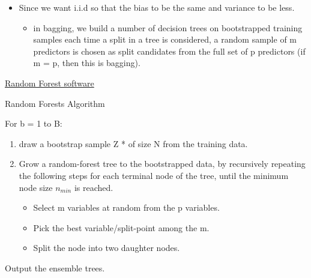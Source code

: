 \documentclass[
]{book}
\providecommand{\tightlist}{%
  \setlength{\itemsep}{0pt}\setlength{\parskip}{0pt}}
\begin{document}
\begin{itemize}
  \begin{itemize}
  \tightlist
  \item
    We can penalize the splitting with a penalty term that depends on the number of times a predictor is selected at a given length.
  \item
    restrict how many items a predictor can be used.
  \item
    allow a certain number of predictors.
  \end{itemize}
\item
  Since we want i.i.d so that the bias to be the same and variance to be less.

  \begin{itemize}
  \tightlist
  \item
    in bagging, we build a number of decision trees on bootstrapped training samples each time a split in a tree is considered, a random sample of m predictors is chosen as split candidates from the full set of p predictors (if m = p, then this is bagging).
  \end{itemize}
\end{itemize}

\href{http://www.stat.berkeley.edu/~breiman/RandomForests/}{Random Forest software}

Random Forests Algorithm

For b = 1 to B:

\begin{enumerate}
\def\labelenumi{\alph{enumi}.}
\item
  draw a bootstrap sample Z * of size N from the training data.\\
\item
  Grow a random-forest tree to the bootstrapped data, by recursively repeating the following steps for each terminal node of the tree, until the minimum node size \(n_{min}\) is reached.

  \begin{itemize}
  \tightlist
  \item
    Select m variables at random from the p variables.\\
  \item
    Pick the best variable/split-point among the m.\\
  \item
    Split the node into two daughter nodes.
  \end{itemize}
\end{enumerate}

Output the ensemble trees.
\end{document}
